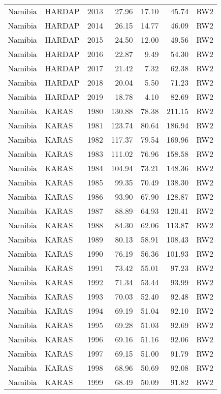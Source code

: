 \begin{longtable}{lllrrrl}
  Namibia & HARDAP & 2013 & 27.96 & 17.10 & 45.74 & RW2 \\ 
  Namibia & HARDAP & 2014 & 26.15 & 14.77 & 46.09 & RW2 \\ 
  Namibia & HARDAP & 2015 & 24.50 & 12.00 & 49.56 & RW2 \\ 
  Namibia & HARDAP & 2016 & 22.87 & 9.49 & 54.30 & RW2 \\ 
  Namibia & HARDAP & 2017 & 21.42 & 7.32 & 62.38 & RW2 \\ 
  Namibia & HARDAP & 2018 & 20.04 & 5.50 & 71.23 & RW2 \\ 
  Namibia & HARDAP & 2019 & 18.78 & 4.10 & 82.69 & RW2 \\ 
  Namibia & KARAS & 1980 & 130.88 & 78.38 & 211.15 & RW2 \\ 
  Namibia & KARAS & 1981 & 123.74 & 80.64 & 186.94 & RW2 \\ 
  Namibia & KARAS & 1982 & 117.37 & 79.54 & 169.96 & RW2 \\ 
  Namibia & KARAS & 1983 & 111.02 & 76.96 & 158.58 & RW2 \\ 
  Namibia & KARAS & 1984 & 104.94 & 73.21 & 148.36 & RW2 \\ 
  Namibia & KARAS & 1985 & 99.35 & 70.49 & 138.30 & RW2 \\ 
  Namibia & KARAS & 1986 & 93.90 & 67.90 & 128.87 & RW2 \\ 
  Namibia & KARAS & 1987 & 88.89 & 64.93 & 120.41 & RW2 \\ 
  Namibia & KARAS & 1988 & 84.30 & 62.06 & 113.87 & RW2 \\ 
  Namibia & KARAS & 1989 & 80.13 & 58.91 & 108.43 & RW2 \\ 
  Namibia & KARAS & 1990 & 76.19 & 56.36 & 101.93 & RW2 \\ 
  Namibia & KARAS & 1991 & 73.42 & 55.01 & 97.23 & RW2 \\ 
  Namibia & KARAS & 1992 & 71.34 & 53.44 & 93.99 & RW2 \\ 
  Namibia & KARAS & 1993 & 70.03 & 52.40 & 92.48 & RW2 \\ 
  Namibia & KARAS & 1994 & 69.19 & 51.04 & 92.10 & RW2 \\ 
  Namibia & KARAS & 1995 & 69.28 & 51.03 & 92.69 & RW2 \\ 
  Namibia & KARAS & 1996 & 69.16 & 51.16 & 92.06 & RW2 \\ 
  Namibia & KARAS & 1997 & 69.15 & 51.00 & 91.79 & RW2 \\ 
  Namibia & KARAS & 1998 & 68.96 & 50.69 & 92.08 & RW2 \\ 
  Namibia & KARAS & 1999 & 68.49 & 50.09 & 91.82 & RW2 \\ 

\end{longtable}
